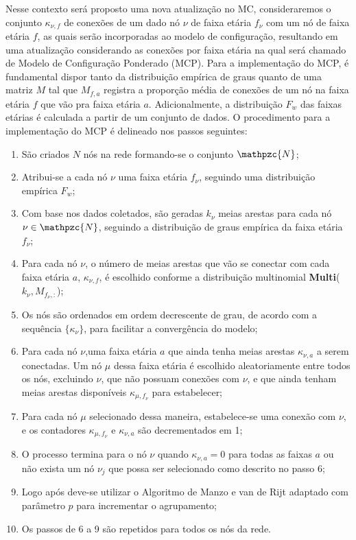 Nesse contexto será proposto uma nova atualização no MC, consideraremos o conjunto 
$\kappa_{\nu,f}$ de conexões de um dado nó 
$\nu$ de faixa etária $f_\nu$ com um nó de faixa etária $f$, 
as quais serão incorporadas ao modelo de configuração, resultando em uma atualização considerando as conexões por faixa etária na qual será chamado de Modelo de Configuração Ponderado (MCP). Para a implementação do MCP, é fundamental dispor tanto da distribuição empírica de graus quanto de uma matriz $M$ tal que 
$M_{f,a}$ registra a proporção média de conexões de um nó na faixa etária $f$ que vão pra faixa etária $a$. 
Adicionalmente, a distribuição $F_w$ das faixas etárias é calculada a partir de um conjunto de dados. O procedimento para a implementação do MCP é delineado nos passos seguintes:
\begin{enumerate}
    \item São criados $N$ nós na rede formando-se o conjunto $\mathpzc{N}$;
    \item Atribui-se a cada nó $\nu$ uma faixa etária $f_\nu$, seguindo uma distribuição empírica $F_w$;
    \item Com base nos dados coletados, são geradas $k_\nu$ meias arestas para cada nó $\nu\in\mathpzc{N}$, seguindo a distribuição de graus empírica da faixa etária $f_\nu$;
    \item Para cada nó $\nu$, o número de meias arestas que vão se conectar com cada faixa etária $a$, $\kappa_{\nu,f}$, é escolhido conforme a distribuição multinomial \textbf{Multi}($k_\nu, M_{f_\nu,:}$);
    \item Os nós são ordenados em ordem decrescente de grau, de acordo com a sequência $\{\kappa_\nu\}$, para facilitar a convergência do modelo;
    \item Para cada nó $\nu$,uma faixa etária $a$ que ainda tenha meias arestas $\kappa_{\nu,a}$ a serem conectadas. Um nó $\mu$ dessa faixa etária é escolhido aleatoriamente entre todos os nós, excluindo $\nu$, que não possuam conexões com $\nu$, e que ainda tenham meias arestas disponíveis $\kappa_{\mu,f_\nu}$ para estabelecer; 
    \item Para cada nó $\mu$ selecionado dessa maneira, estabelece-se uma conexão com $\nu$, e os contadores $\kappa_{\mu,f_\nu}$ e $\kappa_{\nu,a}$ são decrementados em 1;
    \item O processo termina para o nó $\nu$ quando $\kappa_{\nu,a} = 0$ para todas as faixas $a$ ou não exista um nó $\nu_j$ que possa ser selecionado como descrito no passo 6;
    \item Logo após deve-se utilizar o Algoritmo de Manzo e van de Rijt adaptado com parâmetro $p$ para incrementar o agrupamento;
    \item Os passos de 6 a 9 são repetidos para todos os nós da rede.
\end{enumerate}

